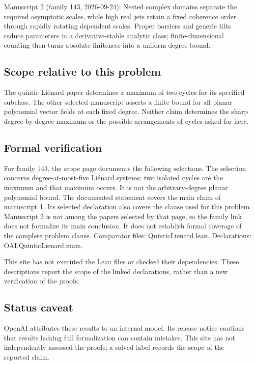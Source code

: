 \documentclass[11pt]{article}
\begin{document}
Manuscript 2 (family 143, 2026-09-24): Nested complex domains separate the required asymptotic scales, while high real jets retain a fixed coherence order through rapidly rotating dependent scales. Proper barriers and generic tilts reduce parameters in a derivative-stable analytic class; finite-dimensional counting then turns absolute finiteness into a uniform degree bound.

\subsection{Scope relative to this problem}
The quintic Li\'enard paper determines a maximum of two cycles for its specified subclass. The other selected manuscript asserts a finite bound for all planar polynomial vector fields at each fixed degree. Neither claim determines the sharp degree-by-degree maximum or the possible arrangements of cycles asked for here.

\subsection{Formal verification}
For family 143, the scope page documents the following selections. The selection concerns degree-at-most-five Liénard systems: two isolated cycles are the maximum and that maximum occurs. It is not the arbitrary-degree planar polynomial bound. The documented statement covers the main claim of manuscript 1. Its selected declaration also covers the clause used for this problem. Manuscript 2 is not among the papers selected by that page, so the family link does not formalize its main conclusion. It does not establish formal coverage of the complete problem clause. Comparator files: QuinticLienard.lean. Declarations: OAI.QuinticLienard.main.

This site has not executed the Lean files or checked their dependencies. These descriptions report the scope of the linked declarations, rather than a new verification of the proofs.

\subsection{Status caveat}
OpenAI attributes these results to an internal model. Its release notice cautions that results lacking full formalization can contain mistakes. This site has not independently assessed the proofs; a solved label records the scope of the reported claim.
\end{document}
